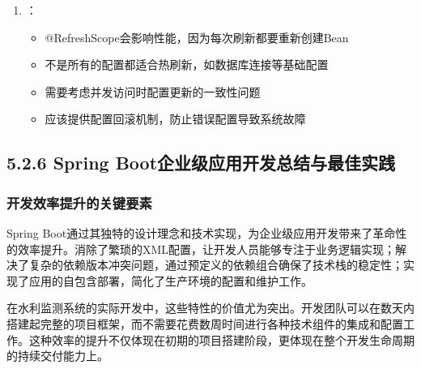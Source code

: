 \begin{enumerate}
  \begin{itemize}
  \tightlist
  \item
    可以集成Nacos、Apollo等配置中心
  \item
    支持配置的版本管理和回滚
  \item
    提供配置变更的审批流程
  \item
    支持灰度发布（部分实例先应用新配置）
  \end{itemize}
\item
  ：

  \begin{itemize}
  \tightlist
  \item
    @RefreshScope会影响性能，因为每次刷新都要重新创建Bean
  \item
    不是所有的配置都适合热刷新，如数据库连接等基础配置
  \item
    需要考虑并发访问时配置更新的一致性问题
  \item
    应该提供配置回滚机制，防止错误配置导致系统故障
  \end{itemize}
\end{enumerate}

\hypertarget{spring-bootux4f01ux4e1aux7ea7ux5e94ux7528ux5f00ux53d1ux603bux7ed3ux4e0eux6700ux4f73ux5b9eux8df5}{%
\subsection{5.2.6 Spring Boot企业级应用开发总结与最佳实践}\label{spring-bootux4f01ux4e1aux7ea7ux5e94ux7528ux5f00ux53d1ux603bux7ed3ux4e0eux6700ux4f73ux5b9eux8df5}}

\hypertarget{ux5f00ux53d1ux6548ux7387ux63d0ux5347ux7684ux5173ux952eux8981ux7d20}{%
\subsubsection{开发效率提升的关键要素}\label{ux5f00ux53d1ux6548ux7387ux63d0ux5347ux7684ux5173ux952eux8981ux7d20}}

Spring Boot通过其独特的设计理念和技术实现，为企业级应用开发带来了革命性的效率提升。消除了繁琐的XML配置，让开发人员能够专注于业务逻辑实现；解决了复杂的依赖版本冲突问题，通过预定义的依赖组合确保了技术栈的稳定性；实现了应用的自包含部署，简化了生产环境的配置和维护工作。

在水利监测系统的实际开发中，这些特性的价值尤为突出。开发团队可以在数天内搭建起完整的项目框架，而不需要花费数周时间进行各种技术组件的集成和配置工作。这种效率的提升不仅体现在初期的项目搭建阶段，更体现在整个开发生命周期的持续交付能力上。

